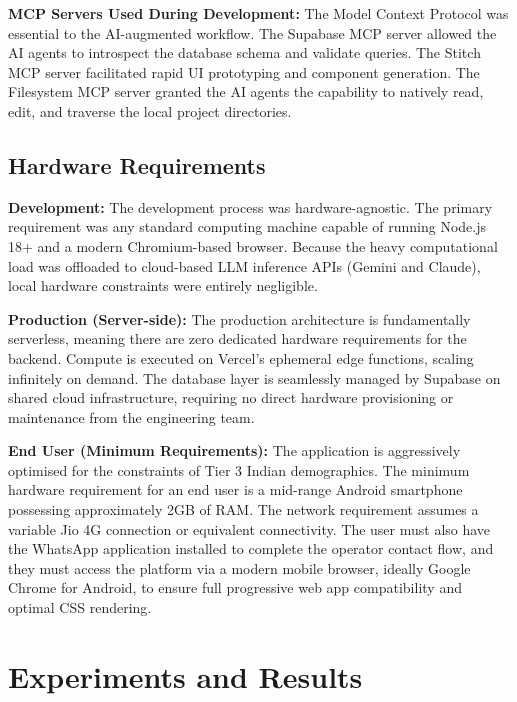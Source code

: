 \documentclass[12pt,a4paper]{report}
\begin{document}
\textbf{MCP Servers Used During Development:}
The Model Context Protocol was essential to the AI-augmented workflow. The Supabase MCP server allowed the AI agents to introspect the database schema and validate queries. The Stitch MCP server facilitated rapid UI prototyping and component generation. The Filesystem MCP server granted the AI agents the capability to natively read, edit, and traverse the local project directories.

\section{Hardware Requirements}

\textbf{Development:}
The development process was hardware-agnostic. The primary requirement was any standard computing machine capable of running Node.js 18+ and a modern Chromium-based browser. Because the heavy computational load was offloaded to cloud-based LLM inference APIs (Gemini and Claude), local hardware constraints were entirely negligible.

\textbf{Production (Server-side):}
The production architecture is fundamentally serverless, meaning there are zero dedicated hardware requirements for the backend. Compute is executed on Vercel's ephemeral edge functions, scaling infinitely on demand. The database layer is seamlessly managed by Supabase on shared cloud infrastructure, requiring no direct hardware provisioning or maintenance from the engineering team.

\textbf{End User (Minimum Requirements):}
The application is aggressively optimised for the constraints of Tier 3 Indian demographics. The minimum hardware requirement for an end user is a mid-range Android smartphone possessing approximately 2GB of RAM. The network requirement assumes a variable Jio 4G connection or equivalent connectivity. The user must also have the WhatsApp application installed to complete the operator contact flow, and they must access the platform via a modern mobile browser, ideally Google Chrome for Android, to ensure full progressive web app compatibility and optimal CSS rendering.

\chapter{Experiments and Results}
\end{document}
